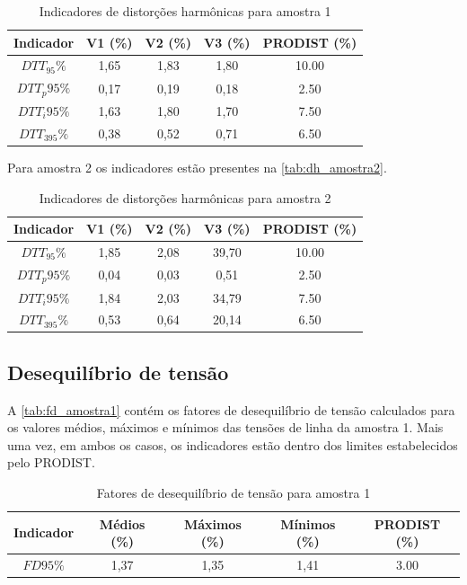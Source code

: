 \begin{table}[H]
  \centering
  \caption{Indicadores de distorções harmônicas para amostra 1}
  \label{tab:dh_amostra1}
  \begin{tabular}{@{}ccccc@{}}
    \toprule
    Indicador & V1 (\%) & V2 (\%) & V3 (\%) & PRODIST  (\%) \\
    \midrule
    $DTT_95\%$   & 1,65 & 1,83 & 1,80 & 10.00 \\
    $DTT_p95\%$ & 0,17 & 0,19 & 0,18 & 2.50 \\
    $DTT_i95\%$ & 1,63 & 1,80 & 1,70 & 7.50 \\
    $DTT_395\%$ & 0,38 & 0,52 & 0,71 & 6.50 \\
    \bottomrule
  \end{tabular}
\end{table}

Para amostra 2 os indicadores estão presentes na \autoref{tab:dh_amostra2}.

\begin{table}[H]
  \centering
  \caption{Indicadores de distorções harmônicas para amostra 2}
  \label{tab:dh_amostra2}
  \begin{tabular}{@{}ccccc@{}}
    \toprule
    Indicador & V1 (\%) & V2 (\%) & V3 (\%) & PRODIST  (\%) \\
    \midrule
    $DTT_95\%$   & 1,85 & 2,08 & 39,70 & 10.00 \\
    $DTT_p95\%$ & 0,04 & 0,03 & 0,51 & 2.50 \\
    $DTT_i95\%$ & 1,84 & 2,03 & 34,79 & 7.50 \\
    $DTT_395\%$ & 0,53 & 0,64 & 20,14 & 6.50 \\
    \bottomrule
  \end{tabular}
\end{table}

\subsection{Desequilíbrio de tensão}

A \autoref{tab:fd_amostra1} contém os fatores de desequilíbrio de tensão calculados para os valores médios, máximos e mínimos das tensões de linha da amostra 1. Mais uma vez, em ambos os casos, os indicadores estão dentro dos limites estabelecidos pelo PRODIST.

\begin{table}[H]
  \centering
  \caption{Fatores de desequilíbrio de tensão para amostra 1}
  \label{tab:fd_amostra1}
  \begin{tabular}{@{}ccccc@{}}
    \toprule
    Indicador & Médios (\%) & Máximos (\%) & Mínimos (\%) & PRODIST (\%) \\
    \midrule
    $FD95\%$  & 1,37 & 1,35 & 1,41 & 3.00 \\
    \bottomrule
  \end{tabular}
\end{table}

